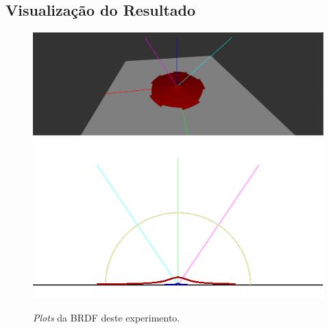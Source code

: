 \subsection{Visualização do Resultado}
\begin{figure}[H]
    \caption{\small{\textit{Plots} da BRDF deste experimento.}}\label{fig-minnaert-plots}
    \vspace{42px}
  \includegraphics[width=\linewidth]{./Imagens/brdfs/minnaert-3D-plot}
\endminipage\hfill
{}
  \includegraphics[width=\linewidth]{./Imagens/brdfs/minnaert-polar-plot.png}
\endminipage\hfill
\end{figure}

